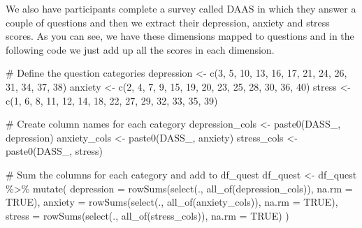\documentclass[
  letterpaper,
  DIV=11,
  numbers=noendperiod]{scrartcl}
\newenvironment{Shaded}{\begin{snugshade}}{\end{snugshade}}
\newcommand{\AttributeTok}[1]{\textcolor[rgb]{0.40,0.45,0.13}{#1}}
\newcommand{\CommentTok}[1]{\textcolor[rgb]{0.37,0.37,0.37}{#1}}
\newcommand{\ConstantTok}[1]{\textcolor[rgb]{0.56,0.35,0.01}{#1}}
\newcommand{\DecValTok}[1]{\textcolor[rgb]{0.68,0.00,0.00}{#1}}
\newcommand{\FunctionTok}[1]{\textcolor[rgb]{0.28,0.35,0.67}{#1}}
\newcommand{\NormalTok}[1]{\textcolor[rgb]{0.00,0.23,0.31}{#1}}
\newcommand{\OtherTok}[1]{\textcolor[rgb]{0.00,0.23,0.31}{#1}}
\newcommand{\SpecialCharTok}[1]{\textcolor[rgb]{0.37,0.37,0.37}{#1}}
\newcommand{\StringTok}[1]{\textcolor[rgb]{0.13,0.47,0.30}{#1}}
\begin{document}
We also have participants complete a survey called DAAS in which they
answer a couple of questions and then we extract their depression,
anxiety and stress scores. As you can see, we have these dimensions
mapped to questions and in the following code we just add up all the
scores in each dimension.

\begin{Shaded}
\begin{Highlighting}[]
\CommentTok{\# Define the question categories}
\NormalTok{depression }\OtherTok{\textless{}{-}} \FunctionTok{c}\NormalTok{(}\DecValTok{3}\NormalTok{, }\DecValTok{5}\NormalTok{, }\DecValTok{10}\NormalTok{, }\DecValTok{13}\NormalTok{, }\DecValTok{16}\NormalTok{, }\DecValTok{17}\NormalTok{, }\DecValTok{21}\NormalTok{, }\DecValTok{24}\NormalTok{, }\DecValTok{26}\NormalTok{, }\DecValTok{31}\NormalTok{, }\DecValTok{34}\NormalTok{, }\DecValTok{37}\NormalTok{, }\DecValTok{38}\NormalTok{)}
\NormalTok{anxiety }\OtherTok{\textless{}{-}} \FunctionTok{c}\NormalTok{(}\DecValTok{2}\NormalTok{, }\DecValTok{4}\NormalTok{, }\DecValTok{7}\NormalTok{, }\DecValTok{9}\NormalTok{, }\DecValTok{15}\NormalTok{, }\DecValTok{19}\NormalTok{, }\DecValTok{20}\NormalTok{, }\DecValTok{23}\NormalTok{, }\DecValTok{25}\NormalTok{, }\DecValTok{28}\NormalTok{, }\DecValTok{30}\NormalTok{, }\DecValTok{36}\NormalTok{, }\DecValTok{40}\NormalTok{)}
\NormalTok{stress }\OtherTok{\textless{}{-}} \FunctionTok{c}\NormalTok{(}\DecValTok{1}\NormalTok{, }\DecValTok{6}\NormalTok{, }\DecValTok{8}\NormalTok{, }\DecValTok{11}\NormalTok{, }\DecValTok{12}\NormalTok{, }\DecValTok{14}\NormalTok{, }\DecValTok{18}\NormalTok{, }\DecValTok{22}\NormalTok{, }\DecValTok{27}\NormalTok{, }\DecValTok{29}\NormalTok{, }\DecValTok{32}\NormalTok{, }\DecValTok{33}\NormalTok{, }\DecValTok{35}\NormalTok{, }\DecValTok{39}\NormalTok{)}

\CommentTok{\# Create column names for each category}
\NormalTok{depression\_cols }\OtherTok{\textless{}{-}} \FunctionTok{paste0}\NormalTok{(}\StringTok{\textquotesingle{}DASS\_\textquotesingle{}}\NormalTok{, depression)}
\NormalTok{anxiety\_cols }\OtherTok{\textless{}{-}} \FunctionTok{paste0}\NormalTok{(}\StringTok{\textquotesingle{}DASS\_\textquotesingle{}}\NormalTok{, anxiety)}
\NormalTok{stress\_cols }\OtherTok{\textless{}{-}} \FunctionTok{paste0}\NormalTok{(}\StringTok{\textquotesingle{}DASS\_\textquotesingle{}}\NormalTok{, stress)}

\CommentTok{\# Sum the columns for each category and add to df\_quest}
\NormalTok{df\_quest }\OtherTok{\textless{}{-}}\NormalTok{ df\_quest }\SpecialCharTok{\%\textgreater{}\%}
  \FunctionTok{mutate}\NormalTok{(}
    \AttributeTok{depression =} \FunctionTok{rowSums}\NormalTok{(}\FunctionTok{select}\NormalTok{(., }\FunctionTok{all\_of}\NormalTok{(depression\_cols)), }\AttributeTok{na.rm =} \ConstantTok{TRUE}\NormalTok{),}
    \AttributeTok{anxiety =} \FunctionTok{rowSums}\NormalTok{(}\FunctionTok{select}\NormalTok{(., }\FunctionTok{all\_of}\NormalTok{(anxiety\_cols)), }\AttributeTok{na.rm =} \ConstantTok{TRUE}\NormalTok{),}
    \AttributeTok{stress =} \FunctionTok{rowSums}\NormalTok{(}\FunctionTok{select}\NormalTok{(., }\FunctionTok{all\_of}\NormalTok{(stress\_cols)), }\AttributeTok{na.rm =} \ConstantTok{TRUE}\NormalTok{)}
\NormalTok{  )}


\end{Highlighting}
\end{Shaded}
\end{document}
